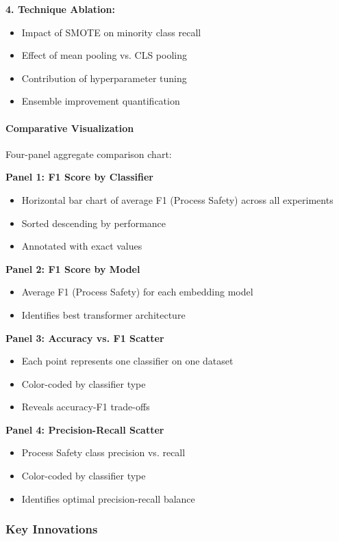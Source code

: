 \documentclass[11pt, titlepage, bibliography=totoc]{scrreprt}
\begin{document}
\textbf{4. Technique Ablation:}
\begin{itemize}
    \item Impact of SMOTE on minority class recall
    \item Effect of mean pooling vs. CLS pooling
    \item Contribution of hyperparameter tuning
    \item Ensemble improvement quantification
\end{itemize}

\paragraph{Comparative Visualization}
Four-panel aggregate comparison chart:

\textbf{Panel 1: F1 Score by Classifier}
\begin{itemize}
    \item Horizontal bar chart of average F1 (Process Safety) across all experiments
    \item Sorted descending by performance
    \item Annotated with exact values
\end{itemize}

\textbf{Panel 2: F1 Score by Model}
\begin{itemize}
    \item Average F1 (Process Safety) for each embedding model
    \item Identifies best transformer architecture
\end{itemize}

\textbf{Panel 3: Accuracy vs. F1 Scatter}
\begin{itemize}
    \item Each point represents one classifier on one dataset
    \item Color-coded by classifier type
    \item Reveals accuracy-F1 trade-offs
\end{itemize}

\textbf{Panel 4: Precision-Recall Scatter}
\begin{itemize}
    \item Process Safety class precision vs. recall
    \item Color-coded by classifier type
    \item Identifies optimal precision-recall balance
\end{itemize}

\subsubsection{Key Innovations}
\end{document}
